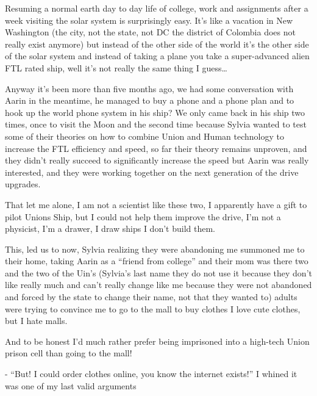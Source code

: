 \documentclass[colorlinks,12pt,a4paper]{book}
\begin{document}
 Resuming a normal earth day to day life of college, work and assignments after a week visiting the solar system is 
 surprisingly easy. It's like a vacation in New Washington (the city, not the state, 
 not DC the district of Colombia does not really exist anymore) but instead of the other side of the world it's the other
  side of the solar system and instead of taking a plane you take a super-advanced alien FTL rated ship, well it's not 
  really the same thing I guess… \par
  \bigskip
 
 Anyway it's been more than five months ago, we had some conversation with Aarin in the meantime, he managed to buy a phone 
 and a phone plan and to hook up the world phone system in his ship? We only came back in his ship two times, once to 
 visit the Moon and the second time because Sylvia wanted to test some of their theories on how to combine Union and
  Human technology to increase the FTL efficiency and speed, so far their theory remains unproven, and they didn't
   really succeed to significantly increase the speed but Aarin was really interested, and they were working 
   together on the next generation of the drive upgrades.\par
   \bigskip
 
 That let me alone, I am not a scientist like these two, I apparently have a gift to pilot Unions Ship, but 
 I could not help them improve the drive, I'm not a physicist, I'm a drawer, I draw ships I don't build them.\par
 \bigskip
 
 This, led us to now, Sylvia realizing they were abandoning me summoned me to their home, taking Aarin as a 
 “friend from college” and their mom was there two and the two of the Uin's (Sylvia's last name they do not use it because 
 they don't like really much and can't really change like me because they were not abandoned and forced by the state 
 to change their name, not that they wanted to) adults were trying to convince me to go to the mall to buy clothes 
 I love cute clothes, but I hate malls.\par
 \bigskip
 
 And to be honest I'd much rather prefer being imprisoned into a high-tech Union prison cell than going to the mall!\par
 \bigskip
 
 - “But! I could order clothes online, you know the internet exists!” I whined it was one of my last valid arguments\par
 \bigskip
 
\end{document}
